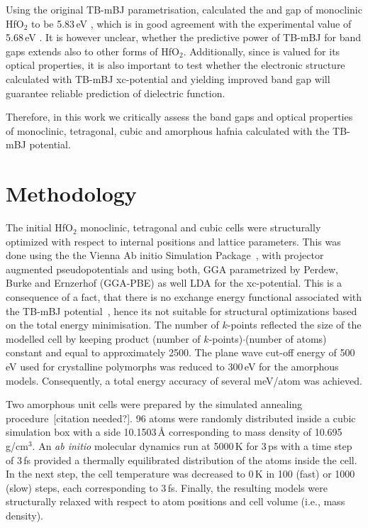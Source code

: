 \documentclass[10pt,a4paper,twocolumn]{article}
\begin{document}
Using the original TB-mBJ parametrisation, \citet{Koller2012} calculated the and gap of monoclinic HfO$_2$ to be 5.83\,eV , which is in good agreement with the experimental value of 5.68\,eV \cite{Balog1977}.
It is however unclear, whether the predictive power of TB-mBJ for band gaps extends also to other forms of HfO$_2$.
Additionally, since  is valued for its optical properties, it is also important to test whether the electronic structure calculated with TB-mBJ xc-potential and yielding improved band gap will guarantee reliable prediction of dielectric function.

Therefore, in this work we critically assess the band gaps and optical properties of monoclinic, tetragonal, cubic and amorphous hafnia calculated with the TB-mBJ potential.

\section{Methodology}

The initial HfO$_2$ monoclinic, tetragonal and cubic cells were structurally optimized with respect to internal positions and lattice parameters.
This was done using the the Vienna Ab initio Simulation Package~\cite{Kresse1996}, with projector augmented pseudopotentials \cite{Kresse1999} and using both, GGA parametrized by Perdew, Burke and Ernzerhof (GGA-PBE) \cite{Perdew1996} as well LDA for the xc-potential.
This is a consequence of a fact, that there is no exchange energy functional associated with the TB-mBJ potential~\cite{Tran2009}, hence its not suitable for structural optimizations based on the total energy minimisation.
The number of $k$-points reflected the size of the modelled cell by keeping product (number of $k$-points)$\cdot$(number of atoms) constant and equal to approximately 2500.
The plane wave cut-off energy of 500\,eV used for crystalline polymorphs was reduced to 300\,eV for the amorphous models.
Consequently, a total energy accuracy of several meV/atom was achieved.

Two amorphous unit cells were prepared by the simulated annealing procedure~[citation needed?].
96 atoms were randomly distributed inside a cubic simulation box with a side 10.1503\,\AA{} corresponding to mass density of 10.695\,g/cm$^3$.
An \textit{ab initio} molecular dynamics run at 5000\,K for 3\,ps with a time step of 3\,fs provided a thermally equilibrated distribution of the atoms inside the cell.
In the next step, the cell temperature was decreased to 0\,K in 100 (fast) or 1000 (slow) steps, each corresponding to 3\,fs.
Finally, the resulting models were structurally relaxed with respect to atom positions and cell volume (i.e., mass density).
\end{document}
